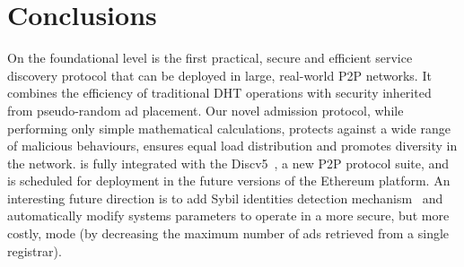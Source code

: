 \section{Conclusions}
\label{sec:con}
On the foundational level \sysname is the first practical, secure and efficient service discovery protocol that can be deployed in large, real-world P2P networks. It combines the efficiency of traditional DHT operations with security inherited from pseudo-random ad placement. Our novel admission protocol, while performing only simple mathematical calculations, protects against a wide range of malicious behaviours, ensures equal load distribution and promotes diversity in the network.
\sysname is fully integrated with the Discv5~\cite{discv5}, a new P2P protocol suite, and is scheduled for deployment in the future versions of the Ethereum platform. 
An interesting future direction is to add Sybil identities detection mechanism~\cite{cholez2010efficient} and automatically modify systems parameters to operate in a more secure, but more costly, mode (\eg by decreasing the maximum number of ads retrieved from a single registrar). 